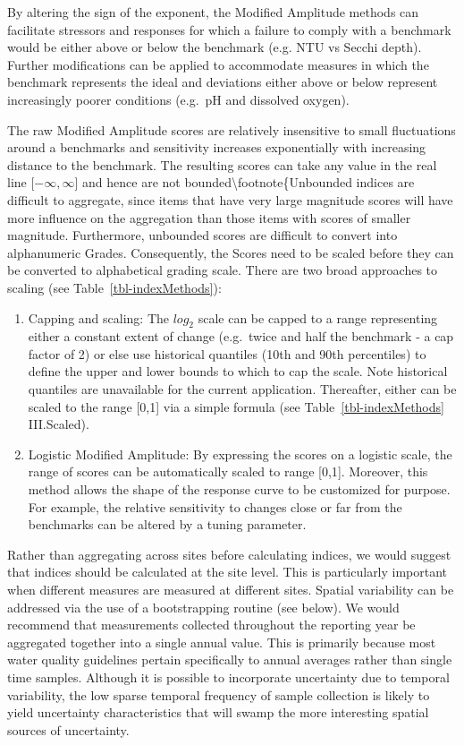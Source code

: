 \documentclass[
  8pt,
  a4paper]{article}
\begin{document}
By altering the sign of the exponent, the Modified Amplitude methods can
facilitate stressors and responses for which a failure to comply with a
benchmark would be either above or below the benchmark (e.g. NTU vs
Secchi depth). Further modifications can be applied to accommodate
measures in which the benchmark represents the ideal and deviations
either above or below represent increasingly poorer conditions (e.g.~pH
and dissolved oxygen).

The raw Modified Amplitude scores are relatively insensitive to small
fluctuations around a benchmarks and sensitivity increases exponentially
with increasing distance to the benchmark. The resulting scores can take
any value in the real line {[}\(-\infty, \infty\){]} and hence are not
bounded\textbackslash footnote\{Unbounded indices are difficult to
aggregate, since items that have very large magnitude scores will have
more influence on the aggregation than those items with scores of
smaller magnitude. Furthermore, unbounded scores are difficult to
convert into alphanumeric Grades. Consequently, the Scores need to be
scaled before they can be converted to alphabetical grading scale. There
are two broad approaches to scaling (see Table~\ref{tbl-indexMethods}):

\begin{enumerate}
\def\labelenumi{\alph{enumi}.}
\item
  Capping and scaling: The \(log_2\) scale can be capped to a range
  representing either a constant extent of change (e.g.~twice and half
  the benchmark - a cap factor of 2) or else use historical quantiles
  (10th and 90th percentiles) to define the upper and lower bounds to
  which to cap the scale. Note historical quantiles are unavailable for
  the current application. Thereafter, either can be scaled to the range
  {[}0,1{]} via a simple formula (see Table~\ref{tbl-indexMethods}
  III.Scaled).
\item
  Logistic Modified Amplitude: By expressing the scores on a logistic
  scale, the range of scores can be automatically scaled to range
  {[}0,1{]}. Moreover, this method allows the shape of the response
  curve to be customized for purpose. For example, the relative
  sensitivity to changes close or far from the benchmarks can be altered
  by a tuning parameter.
\end{enumerate}

Rather than aggregating across sites before calculating indices, we
would suggest that indices should be calculated at the site level. This
is particularly important when different measures are measured at
different sites. Spatial variability can be addressed via the use of a
bootstrapping routine (see below). We would recommend that measurements
collected throughout the reporting year be aggregated together into a
single annual value. This is primarily because most water quality
guidelines pertain specifically to annual averages rather than single
time samples. Although it is possible to incorporate uncertainty due to
temporal variability, the low sparse temporal frequency of sample
collection is likely to yield uncertainty characteristics that will
swamp the more interesting spatial sources of uncertainty.
\end{document}
